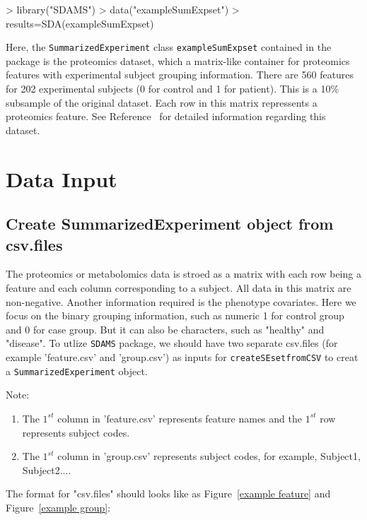 \documentclass[12pt]{article}
\begin{document}
\begin{Schunk}
\begin{Sinput}
> library("SDAMS")
> data("exampleSumExpset")
> results=SDA(exampleSumExpset)
\end{Sinput}
\end{Schunk}

Here, the {\tt SummarizedExperiment} class {\tt exampleSumExpset} contained in
the package is the proteomics dataset, which a matrix-like container for
proteomics features with experimental subject grouping information. There are
560 features for 202 experimental subjects (0 for control and 1 for patient).
This is a 10\% subsample of the original dataset. Each row in this matrix
repressents a proteomics feature. See Reference~ \cite{siwy2011human} for
detailed information regarding this dataset.



\section{Data Input}


\subsection{Create SummarizedExperiment object from csv.files}
The proteomics or metabolomics data is stroed as a matrix with each
row being a feature and each column corresponding to a subject. All data in this
matrix are non-negative. Another information required is the phenotype
covariates. Here we focus on the binary grouping information, such as numeric 1
for control group and 0 for case group. But it can also be characters, such as
"healthy" and "disease". To utlize {\tt SDAMS} package, we should have two
separate csv.files (for example 'feature.csv' and 'group.csv') as inputs for
{\tt createSEsetfromCSV} to creat a {\tt SummarizedExperiment} object.

Note:
\begin{enumerate}
\item The $1^{st}$ column in 'feature.csv' represents feature names and the
      $1^{st}$ row represents subject codes.
\item The $1^{st}$ column in 'group.csv' represents subject codes, for example,
      Subject1, Subject2....
\end{enumerate}


The format for "csv.files" should looks like as Figure~\ref{example feature}
and Figure~\ref{example group}:
\end{document}
